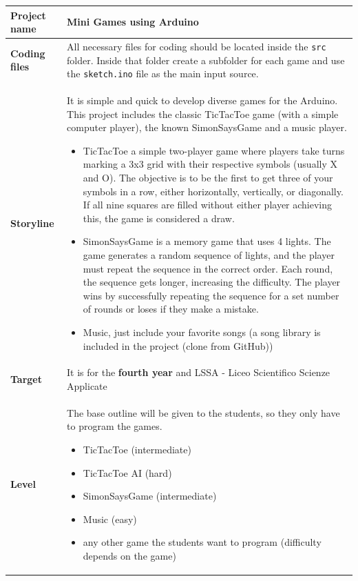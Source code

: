 \documentclass[10pt]{article}
\begin{document}
\begin{longtable}{|p{3.5cm}|p{11cm}|}
  \hline
  \textbf{Project name} & \textbf{Mini Games} using Arduino  \\ \hline
  
  \textbf{Coding files} & All necessary files for coding should be located inside the \texttt{src} folder. Inside that folder create a subfolder for each game and use the \texttt{sketch.ino} file as the main input source.  \\ \hline
  
  \textbf{Storyline} & It is simple and quick to develop diverse games for the Arduino. This project includes the classic TicTacToe game (with a simple computer player), the known SimonSaysGame and a music player. 
  \begin{itemize}
    \item TicTacToe a simple two-player game where players take turns marking a 3x3 grid with their respective symbols (usually X and O). The objective is to be the first to get three of your symbols in a row, either horizontally, vertically, or diagonally. If all nine squares are filled without either player achieving this, the game is considered a draw.
    \item SimonSaysGame is a memory game that uses 4 lights. The game generates a random sequence of lights, and the player must repeat the sequence in the correct order. Each round, the sequence gets longer, increasing the difficulty. The player wins by successfully repeating the sequence for a set number of rounds or loses if they make a mistake.
    \item Music, just include your favorite songs (a song library is included in the project (clone from GitHub))
  \end{itemize}\\ \hline
  
  \textbf{Target} & It is for the \textbf{fourth year} and LSSA - Liceo Scientifico Scienze Applicate \\ \hline
  
  \textbf{Level} & 
  The base outline will be given to the students, so they only have to program the games.
  \begin{itemize}
    \item TicTacToe (intermediate)
    \item TicTacToe AI (hard)
    \item SimonSaysGame (intermediate)
    \item Music (easy)
    \item any other game the students want to program (difficulty depends on the game)
  \end{itemize} \\ \hline
  

\end{longtable}
\end{document}
